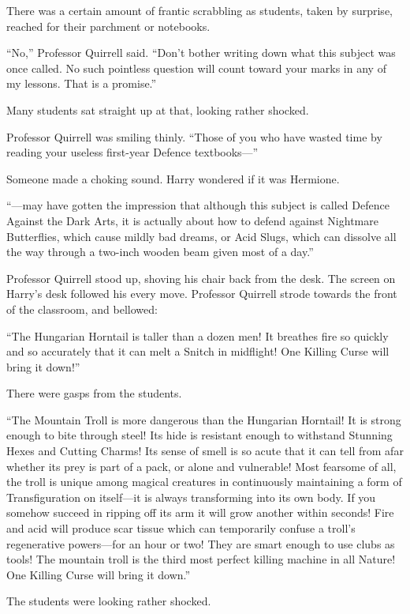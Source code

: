 There was a certain amount of frantic scrabbling as students, taken by
surprise, reached for their parchment or notebooks.

``No,'' Professor Quirrell said. ``Don't bother writing down what this
subject was once called. No such pointless question will count toward
your marks in any of my lessons. That is a promise.''

Many students sat straight up at that, looking rather shocked.

Professor Quirrell was smiling thinly. ``Those of you who have wasted
time by reading your useless first-year Defence textbooks---''

Someone made a choking sound. Harry wondered if it was Hermione.

``---may have gotten the impression that although this subject is called
Defence Against the Dark Arts, it is actually about how to defend
against Nightmare Butterflies, which cause mildly bad dreams, or Acid
Slugs, which can dissolve all the way through a two-inch wooden beam
given most of a day.''

Professor Quirrell stood up, shoving his chair back from the desk. The
screen on Harry's desk followed his every move. Professor Quirrell
strode towards the front of the classroom, and bellowed:

``The Hungarian Horntail is taller than a dozen men! It breathes fire so
quickly and so accurately that it can melt a Snitch in midflight! One
Killing Curse will bring it down!''

There were gasps from the students.

``The Mountain Troll is more dangerous than the Hungarian Horntail! It
is strong enough to bite through steel! Its hide is resistant enough to
withstand Stunning Hexes and Cutting Charms! Its sense of smell is so
acute that it can tell from afar whether its prey is part of a pack, or
alone and vulnerable! Most fearsome of all, the troll is unique among
magical creatures in continuously maintaining a form of Transfiguration
on itself---it is always transforming into its own body. If you somehow
succeed in ripping off its arm it will grow another within seconds! Fire
and acid will produce scar tissue which can temporarily confuse a
troll's regenerative powers---for an hour or two! They are smart enough
to use clubs as tools! The mountain troll is the third most perfect
killing machine in all Nature! One Killing Curse will bring it down.''

The students were looking rather shocked.


